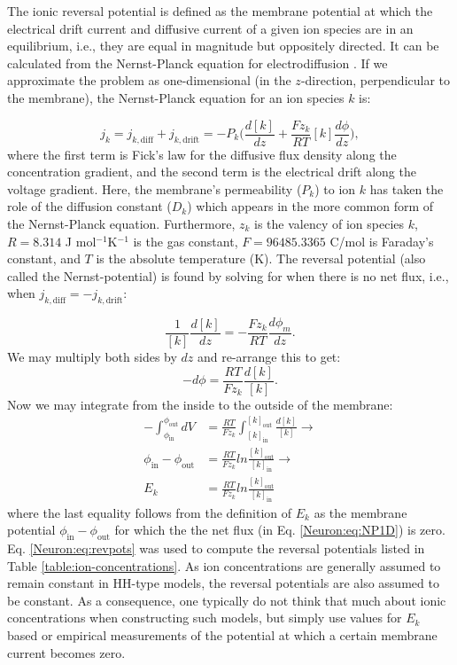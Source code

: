 The ionic reversal potential is defined as the membrane potential at which the electrical drift current and diffusive current of a given ion species are in an equilibrium, i.e., they are equal in magnitude but oppositely directed. It can be calculated from the Nernst-Planck equation for electrodiffusion . If we approximate the problem as one-dimensional (in the $z$-direction, perpendicular to the membrane), the Nernst-Planck equation for an ion species $k$ is:

\begin{equation}
j_k = j_{k,\text{diff}} + j_{k,\text{drift}} 
=  - P_k \Big(\frac{d[k]}{dz} +  \frac{Fz_k}{RT}  [k] \frac{d\phi}{dz} \Big), 
\label{Neuron:eq:NP1D}
\end{equation}
where the first term is Fick's law for the diffusive flux density along the concentration gradient, and the second term is the electrical drift along the voltage gradient. Here, the membrane's permeability ($P_k$) to ion $k$ has taken the role of the diffusion constant ($D_k$) which appears in the more common form of the Nernst-Planck equation. Furthermore, $z_{k}$ is the valency of ion species $k$, $R = 8.314$ J mol$^{-1}$K$^{-1}$ is the gas constant, $F = 96485.3365$ C/mol is Faraday's constant, and $T$ is the absolute temperature (K). The reversal potential (also called the Nernst-potential) is found by solving for when there is no net flux, i.e., when  $j_{k,\text{diff}} = - j_{k,\text{drift}}$:

\begin{equation}
\frac{1}{[k]} \frac{d[k]}{dz} = - \frac{Fz_k}{RT}  \frac{d\phi_m}{dz}.
\end{equation}
We may multiply both sides by $dz$ and re-arrange this to get:
\begin{equation}
-d\phi = \frac{RT}{Fz_k}  \frac{d[k]}{[k]}.
\end{equation}
Now we may integrate from the inside to the outside of the membrane:
\begin{align}
-\int_{\phi_{\text{in}}}^{\phi_{\text{out}}}  dV &= \frac{RT}{Fz_k}  \int_{[k]_{\text{in}}}^{[k]_{\text{out}}} \frac{d[k]}{[k]} \rightarrow \\
\phi_{\text{in}}-\phi_{\text{out}} &= \frac{RT}{Fz_k} ln \frac{[k]_{\text{out}}} {[k]_{\text{in}}} \rightarrow \\
E_k & =  \frac{RT}{Fz_k}  ln \frac{[k]_{\text{out}}} {[k]_{\text{in}}} 
\label{Neuron:eq:revpots}
\end{align}
where the last equality follows from the definition of $E_k$ as the membrane potential $\phi_{\text{in}}-\phi_{\text{out}}$ for which the the net flux (in Eq. \ref{Neuron:eq:NP1D}) is zero. Eq. \ref{Neuron:eq:revpots} was used to compute the reversal potentials listed in Table \ref{table:ion-concentrations}. As ion concentrations are generally assumed to remain constant in HH-type models, the reversal potentials are also assumed to be constant. As a consequence, one typically do not think that much about ionic concentrations when constructing such models, but simply use values for $E_k$ based or empirical measurements of the potential at which a certain membrane current becomes zero.

